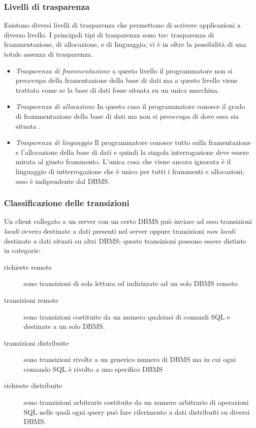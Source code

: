 \subsubsection{Livelli di trasparenza}
Esistono diversi livelli di trasparenza che permettono di scrivere applicazioni a diverso livello. I principali tipi di trasparenza sono tre: trasparenza di frammentazione, di allocazione, e di linguaggio; vi è in oltre la possibilità di una totale assenza di trasparenza.
\begin{itemize}
\item \emph{Trasparenza di frammentazione} a questo livello il programmatore non si preoccupa della framentazione della base di dati ma a questo livello viene trattata come se la base di dati fosse situata su un unica macchina.
\item \emph{Trasparenza di allocazione} In questo caso il programmatore conosce il grado di frammentazione della base di dati ma non si preoccupa di dove essa sia situata .
\item \emph{Trasparenza di linguaggio} Il programmatore conosce tutto sulla framentazione e l'allocazione della base di dati e quindi la singola interrogazione deve essere mirata al giusto frammento. L'unica cosa che viene ancora ignorata è il linguaggio di intterrogazione che è unico per tutti i frammenti e allocazioni; esso è indipendente dal DBMS.

\end{itemize}
\subsubsection{Classificazione delle transizioni}
Un client collegato a un server con un certo DBMS può inviare ad esso transizioni \emph{locali} ovvero destinate a dati presenti nel server oppure transizioni \emph{non locali} destinate a dati situati su altri DBMS; queste transizioni possono essere distinte in categorie:
\begin{description}
\item [richieste remote] sono transizioni di sola lettura ed indirizzate ad un solo DBMS remoto
\item [transizioni remote] sono transizioni costituite da un numero qualsiasi di comandi SQL e destinate a un solo DBMS.
\item [transizioni distribuite] sono transizioni rivolte a un generico numero di DBMS ma in cui ogni comando SQL è rivolto a uno specifico DBMS
\item [richieste distribuite] sono tranzizioni arbitrarie costituite da un numero arbitrario di operazioni SQL nelle quali ogni query può fare riferimento a dati distribuiti su diversi DBMS.
\end{description}
